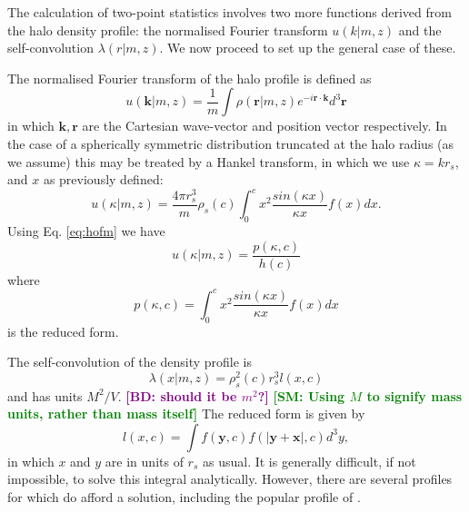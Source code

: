 \documentclass[5p]{elsarticle}
\newcommand{\bd}[1]{\textcolor{purple}{\textbf{[BD: #1]}}}
\newcommand{\sgm}[1]{\textcolor{green}{\textbf{[SM: #1]}}}
\begin{document}
The calculation of two-point statistics involves two more functions derived from the halo density profile: the normalised Fourier transform $u(k|m,z)$ and the self-convolution $\lambda(r|m,z)$. We now proceed to set up the general case of these.

The normalised Fourier transform of the halo profile is defined as \citep{Cooray2002}
\begin{equation}
\label{eq:ugeneral}
u(\mathbf{k}|m,z) = \frac{1}{m}\int \rho(\mathbf{r}|m,z) e^{-i\mathbf{r}\cdot\mathbf{k}}d^3\mathbf{r}
\end{equation}
in which $\mathbf{k},\mathbf{r}$ are the Cartesian wave-vector and position vector respectively.
In the case of a spherically symmetric distribution truncated at the halo radius (as we assume) this may be treated by a Hankel transform, in which we use $\kappa = kr_s$, and $x$ as previously defined:
\begin{equation}
u(\kappa|m,z) = \frac{4\pi r_s^3}{m}\rho_s(c)\int_0^c x^2 \frac{sin(\kappa x)}{\kappa x}f(x) dx.
\end{equation}
Using Eq. \ref{eq:hofm} we have
\begin{equation}
\label{eq:uspherical}
u(\kappa |m,z) = \frac{p(\kappa,c)}{h(c)}
\end{equation}
where
\begin{equation}
\label{eq:pofck}
p(\kappa,c) = \int_0^c x^2 \frac{sin(\kappa x)}{\kappa x}f(x) dx
\end{equation}
is the reduced form.

The self-convolution of the density profile is
\begin{equation}
\label{eq:simplifiedlam}
 \lambda(x|m,z) = \rho_s^2(c) r_s^3 l(x,c)
\end{equation}
and has units $M^2/V$. \bd{should it be $m^2$?} \sgm{Using $M$ to signify mass units, rather than mass itself} The reduced form is given by
\begin{equation}
\label{eq:lofxc}
l(x,c) = \int f(\mathbf{y},c)f(|\mathbf{y}+\mathbf{x}|,c)d^3y,
\end{equation}
in which $x$ and $y$ are in units of $r_s$ as usual. It is generally difficult, if not impossible, to solve this integral analytically. 
However, there are several profiles for which do afford a solution, including the popular profile of \citet[][hereafter NFW]{Navarro1997}.
\end{document}
